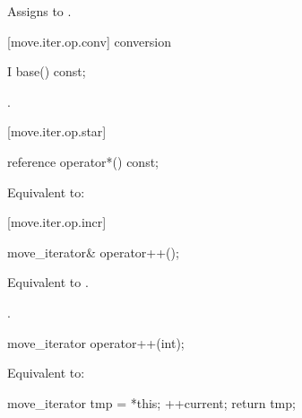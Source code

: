 \begin{itemdescr}
\pnum
\effects Assigns  to
.
\end{itemdescr}

[move.iter.op.conv]{ conversion}

%
%
\begin{itemdecl}
I base() const;
\end{itemdecl}

\begin{itemdescr}
\pnum
\returns {}.
\end{itemdescr}

[move.iter.op.star]{}

%
%
\begin{itemdecl}
reference operator*() const;
\end{itemdecl}

\begin{itemdescr}
\pnum
\effects Equivalent to:
\end{itemdescr}

[move.iter.op.incr]{}

%
%
\begin{itemdecl}
move_iterator& operator++();
\end{itemdecl}

\begin{itemdescr}
\pnum
\effects Equivalent to .

\pnum
\returns {}.
\end{itemdescr}

%
%
\begin{itemdecl}
move_iterator operator++(int);
\end{itemdecl}

\begin{itemdescr}
\pnum
\effects Equivalent to:
\begin{codeblock}
move_iterator tmp = *this;
++current;
return tmp;
\end{codeblock}
\end{itemdescr}

